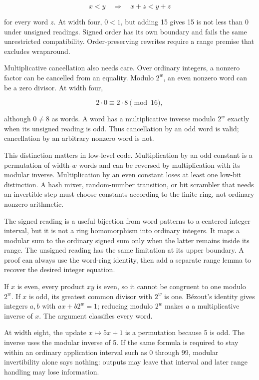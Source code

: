 \[
  x<y\quad\Longrightarrow\quad x+z<y+z
\]

for every word \(z\). At width four, \(0<1\), but adding 15 gives
15 is not less than 0 under unsigned readings. Signed order has its own boundary and
fails the same unrestricted compatibility. Order-preserving rewrites require a
range premise that excludes wraparound.

Multiplicative cancellation also needs care. Over ordinary integers, a
nonzero factor can be cancelled from an equality. Modulo \(2^w\), an even
nonzero word can be a zero divisor. At width four,

\[
  2\cdot0\equiv2\cdot8\pmod{16},
\]

although \(0\ne8\) as words. A word has a multiplicative inverse modulo
\(2^w\) exactly when its unsigned reading is odd. Thus cancellation by an odd
word is valid; cancellation by an arbitrary nonzero word is not.

This distinction matters in low-level code. Multiplication by an odd constant
is a permutation of width-\(w\) words and can be reversed by multiplication
with its modular inverse. Multiplication by an even constant loses at least
one low-bit distinction. A hash mixer, random-number transition, or bit
scrambler that needs an invertible step must choose constants according to the
finite ring, not ordinary nonzero arithmetic.

The signed reading is a useful bijection from word patterns to a centered
integer interval, but it is not a ring homomorphism into ordinary integers.
It maps a modular sum to the ordinary signed sum only when the latter remains
inside its range. The unsigned reading has the same limitation at its upper
boundary. A proof can always use the word-ring identity, then add a separate
range lemma to recover the desired integer equation.

\begin{proofkit}[title={Odd words are exactly the invertible words modulo a power of two}]
If \(x\) is even, every product \(xy\) is even, so it cannot be congruent to
one modulo \(2^w\). If \(x\) is odd, its greatest common divisor with \(2^w\)
is one. Bézout's identity gives integers \(a,b\) with
\(ax+b2^w=1\); reducing modulo \(2^w\) makes \(a\) a multiplicative inverse
of \(x\). The argument classifies every word.
\end{proofkit}

\begin{example}[title={A reversible word update that is not reversible over an interval}]
At width eight, the update \(x\mapsto5x+1\) is a permutation because 5 is odd.
The inverse uses the modular inverse of 5. If the same formula is required to
stay within an ordinary application interval such as 0 through 99, modular
invertibility alone says nothing: outputs may leave that interval and later
range handling may lose information.
\end{example}

